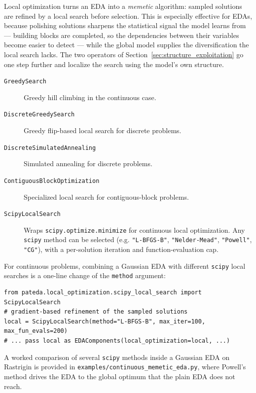 \documentclass[a4paper,11pt]{article}
\begin{document}
Local optimization turns an EDA into a \emph{memetic} algorithm: sampled
solutions are refined by a local search before selection. This is especially
effective for EDAs, because polishing solutions sharpens the statistical signal
the model learns from --- building blocks are completed, so the dependencies
between their variables become easier to detect --- while the global model
supplies the diversification the local search lacks. The two operators of
Section~\ref{sec:structure_exploitation} go one step further and localize the
search using the model's own structure.

\begin{description}
  \item[\texttt{GreedySearch}]
    Greedy hill climbing in the continuous case.

  \item[\texttt{DiscreteGreedySearch}]
    Greedy flip-based local search for discrete problems.

  \item[\texttt{DiscreteSimulatedAnnealing}]
    Simulated annealing for discrete problems.

  \item[\texttt{ContiguousBlockOptimization}]
    Specialized local search for contiguous-block problems.

  \item[\texttt{ScipyLocalSearch}]
    Wraps \texttt{scipy.optimize.minimize} for continuous local optimization.
    Any \texttt{scipy} method can be selected (e.g. \texttt{"L-BFGS-B"},
    \texttt{"Nelder-Mead"}, \texttt{"Powell"}, \texttt{"CG"}), with a per-solution
    iteration and function-evaluation cap.
\end{description}

For continuous problems, combining a Gaussian EDA with different \texttt{scipy}
local searches is a one-line change of the \texttt{method} argument:

\begin{lstlisting}
from pateda.local_optimization.scipy_local_search import ScipyLocalSearch
# gradient-based refinement of the sampled solutions
local = ScipyLocalSearch(method="L-BFGS-B", max_iter=100, max_fun_evals=200)
# ... pass local as EDAComponents(local_optimization=local, ...)
\end{lstlisting}

A worked comparison of several \texttt{scipy} methods inside a Gaussian EDA on
Rastrigin is provided in \texttt{examples/continuous\_memetic\_eda.py}, where
Powell's method drives the EDA to the global optimum that the plain EDA does not
reach.
\end{document}
